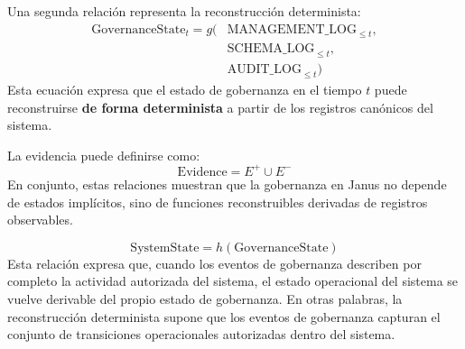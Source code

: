 \documentclass[conference]{IEEEtran}
\begin{document}
Una segunda relación representa la reconstrucción determinista:
\begin{equation}
\begin{split}
\mathrm{GovernanceState}_{t}=g(&\mathrm{MANAGEMENT\_LOG}_{\le t},\\
&\mathrm{SCHEMA\_LOG}_{\le t},\\
&\mathrm{AUDIT\_LOG}_{\le t})
\end{split}
\end{equation}
Esta ecuación expresa que el estado de gobernanza en el tiempo \textbf{$t$} puede reconstruirse \textbf{de forma determinista} a partir de los registros canónicos del sistema.

La evidencia puede definirse como:
\begin{equation}
\mathrm{Evidence}=E^{+}\cup E^{-}
\end{equation}
En conjunto, estas relaciones muestran que la gobernanza en Janus no depende de estados implícitos, sino de funciones reconstruibles derivadas de registros observables.

\begin{equation}
\mathrm{SystemState}=h(\mathrm{GovernanceState})
\end{equation}
Esta relación expresa que, cuando los eventos de gobernanza describen por completo la actividad autorizada del sistema, el estado operacional del sistema se vuelve derivable del propio estado de gobernanza. En otras palabras, la reconstrucción determinista supone que los eventos de gobernanza capturan el conjunto de transiciones operacionales autorizadas dentro del sistema.
\end{document}
